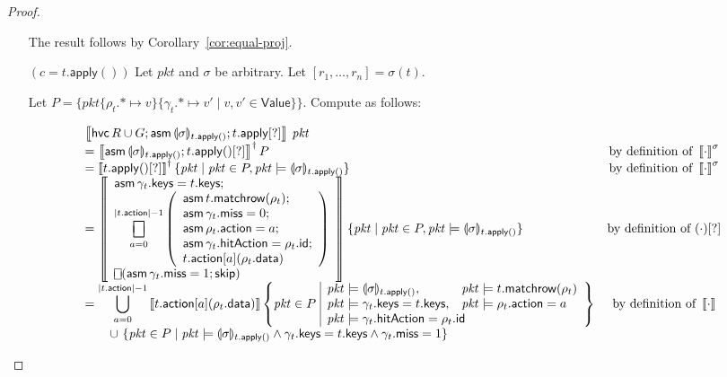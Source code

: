 \documentclass{article}
\newcommand{\pkt}{\mathit{pkt}}
\newcommand{\denote}[1]{\left\llbracket#1\right\rrbracket}
\newcommand{\Value}{\mathsf{Value}}
\newcommand{\action}{\mathsf{action}}
\newcommand{\keys}{\mathsf{keys}}
\newcommand{\data}{\mathsf{data}}
\newcommand{\id}{\mathsf{id}}
\newcommand{\hitAction}{\mathsf{hitAction}}
\newcommand{\miss}{\mathsf{miss}}
\newcommand{\assume}{\mathop{\mathsf{asm}}}
\newcommand{\apply}{\mathsf{apply}}
\newcommand{\choiceop}{\rotatebox[origin=c]{90}{$\sqsubset\!\!\!\sqsupset$}}
\newcommand{\choice}{\mathbin{\choiceop}}
\DeclareMathOperator*{\bigchoice}{\scalerel*{\choiceop}{\sum}}
\newcommand{\havoc}[1]{\mathop{\mathsf{hvc}}#1}
\newcommand{\SKIP}{\mathsf{skip}}
\newcommand{\state}[1]{\llparenthesis#1\rrparenthesis}
\newcommand{\instr}{[?]}
\newcommand{\matchrow}{\mathsf{matchrow}}
\theoremstyle{plain}
\theoremstyle{definition}
\theoremstyle{remark}
\begin{document}
\begin{proof}
\begin{enumerate}[align=left]
    The result follows by Corollary~\ref{cor:equal-proj}.

  \item[$(c = t.\apply())$] Let $\pkt$ and $\sigma$ be arbitrary. Let
    $[r_1,\ldots, r_n] = \sigma(t)$.

    Let $P = \{\pkt\{\rho_t.* \mapsto
      v\}\{\gamma_t.* \mapsto v' \mid v,v' \in \Value\} \}$.
      Compute as follows:

      \[\begin{array}{lcl}
      \denote{\havoc R \cup G; \assume {\state\sigma_{t.\apply()}}; t.\apply\instr}\,\pkt
      & \\
      = \denote{\assume {\state\sigma_{t.\apply()}}; t.\apply()\instr}^\dagger P
      & \text{by definition of }\denote{\cdot}^\sigma \\
      = \denote{t.\apply()\instr}^\dagger \{\pkt \mid \pkt \in P, \pkt \models \state\sigma_{t.\apply()} \}
      & \text{by definition of }\denote{\cdot}^\sigma \\
      = \denote{  \begin{array}{l} \displaystyle
          \assume \gamma_t.\keys = t.\keys; \\
          \displaystyle \bigchoice_{a=0}^{|t.\action| -1}
          \left(\begin{array}{l}
            \assume t.\matchrow(\rho_t); \\
            \assume \gamma_t.\miss = 0;\\
            \assume \rho_t.\action = a;\\
            \assume \gamma_t.\hitAction = \rho_t.\id;\\
            t.\action[a](\rho_t.\data)
          \end{array}\right) \\
          \choice (\assume \gamma_t.\miss = 1;\SKIP) \\
      \end{array}}
      \{\pkt \mid \pkt \in P, \pkt \models \state\sigma_{t.\apply()} \}
      & \text{by definition of }(\cdot)\instr \\
      = \displaystyle\bigcup_{a=0}^{|t.\action| - 1}
      \denote{t.\action[a](\rho_t.\data)}
      \left\{\pkt \in P\,\, \begin{array}{|ll}
        \pkt \models \state\sigma_{t.\apply()}, & \pkt \models t.\matchrow(\rho_t)\\
        \pkt \models \gamma_t.\keys = t.\keys, & \pkt \models \rho_t.\action = a \\
        \multicolumn{2}{|l}{\pkt \models \gamma_t.\hitAction = \rho_t.\id}
      \end{array}\right\}
      & \text{by definition of }\denote{\cdot}\\
      \qquad \cup\,\,\{\pkt \in P \mid \pkt \models \state\sigma_{t.\apply()} \wedge \gamma_t.\keys = t.\keys \wedge \gamma_t.\miss = 1 \}
      \end{array}\]


\end{enumerate}
\end{proof}
\end{document}
